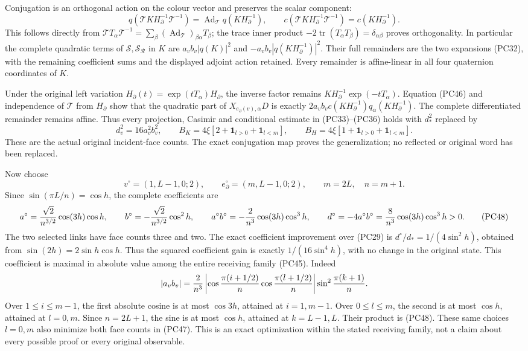 \documentclass[11pt]{article}
\begin{document}
Conjugation is an orthogonal action on the colour vector and preserves
the scalar component:
\[
 q(\mathcal T K H_\partial^{-1}\mathcal T^{-1})
   =\operatorname{Ad}_{\mathcal T}q(KH_\partial^{-1}),\qquad
 c(\mathcal T K H_\partial^{-1}\mathcal T^{-1})=c(KH_\partial^{-1}).
 \tag{PC46}
\]
This follows directly from
\(\mathcal TT_\alpha\mathcal T^{-1}
=\sum_\beta(\operatorname{Ad}_{\mathcal T})_{\beta\alpha}T_\beta\);
the trace inner product
\(-2\operatorname{tr}(T_\alpha T_\beta)=\delta_{\alpha\beta}\)
proves orthogonality. In particular the complete quadratic terms
of \(\mathcal S,\mathcal S_{\mathcal R}\) in \(K\) are
\(a_vb_v|q(K)|^2\) and \(-a_vb_v|q(KH_\partial^{-1})|^2\).
Their full remainders are the two expansions (PC32), with the
remaining coefficient sums and the displayed adjoint action retained.
Every remainder is affine-linear in all four quaternion coordinates
of \(K\).

Under the original left variation
\(H_\partial(t)=\exp(tT_\alpha)H_\partial\), the inverse factor remains
\(KH_\partial^{-1}\exp(-tT_\alpha)\). Equation (PC46) and independence
of \(\mathcal T\) from \(H_\partial\) show that the quadratic part of
\(X_{e_\partial(v),\alpha}D\) is exactly
\(2a_vb_vc(KH_\partial^{-1})q_\alpha(KH_\partial^{-1})\).
The complete differentiated remainder remains affine. Thus every
projection, Casimir and conditional estimate in (PC33)–(PC36)
holds with \(d_*^2\) replaced by
\[
 d_v^2=16a_v^2b_v^2,\qquad
 B_K=4\xi[2+\mathbf1_{l>0}+\mathbf1_{l<m}],\qquad
 B_H=4\xi[1+\mathbf1_{l>0}+\mathbf1_{l<m}].
 \tag{PC47}
\]
These are the actual original incident-face counts. The exact
conjugation map proves the generalization; no reflected or original
word has been replaced.

Now choose
\[
 v^\circ=(1,L-1,0;2),\qquad
 e_\partial^\circ=(m,L-1,0;2),\qquad m=2L,\quad n=m+1.
\]
Since
\(\sin(\pi L/n)=\cos h\), the complete coefficients are
\[
 a^\circ={\sqrt2\over n^{3/2}}\cos(3h)\cos h,\qquad
 b^\circ=-{\sqrt2\over n^{3/2}}\cos^2h,\qquad
 a^\circ b^\circ=-{2\over n^3}\cos(3h)\cos^3h,
 \qquad
 d^\circ=-4a^\circ b^\circ
       ={8\over n^3}\cos(3h)\cos^3h>0 .
 \tag{PC48}
\]
The two selected links have face counts three and two. The exact coefficient improvement over (PC29) is
\(d^\circ/d_*=1/(4\sin^2h)\), obtained from
\(\sin(2h)=2\sin h\cos h\). Thus the squared coefficient gain
is exactly \(1/(16\sin^4h)\), with no change in the original state.
This coefficient is maximal
in absolute value among the entire receiving family (PC45).
Indeed
\[
 |a_vb_v|={2\over n^3}
 \left|\cos{\pi(i+1/2)\over n}
             \cos{\pi(l+1/2)\over n}\right|
             \sin^2{\pi(k+1)\over n}.
\]
Over \(1\le i\le m-1\), the first absolute cosine is at most
\(\cos3h\), attained at \(i=1,m-1\).
Over \(0\le l\le m\), the second is at most \(\cos h\), attained
at \(l=0,m\). Since \(n=2L+1\), the sine is at most \(\cos h\),
attained at \(k=L-1,L\). Their product is (PC48). These same
choices \(l=0,m\) also minimize both face counts in (PC47).
This is an exact optimization within the stated receiving family,
not a claim about every possible proof or every original observable.
\end{document}
